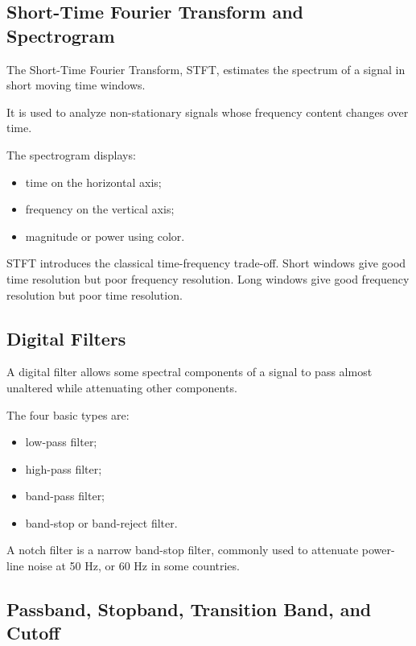 \subsection{Short-Time Fourier Transform and Spectrogram}

The Short-Time Fourier Transform, STFT, estimates the spectrum of a signal in short moving time windows.

It is used to analyze non-stationary signals whose frequency content changes over time.

The spectrogram displays:

\begin{itemize}[noitemsep]
    \item time on the horizontal axis;
    \item frequency on the vertical axis;
    \item magnitude or power using color.
\end{itemize}

\begin{authornote}
STFT introduces the classical time-frequency trade-off. Short windows give good time resolution but poor frequency resolution. Long windows give good frequency resolution but poor time resolution.
\end{authornote}

\subsection{Digital Filters}

A digital filter allows some spectral components of a signal to pass almost unaltered while attenuating other components.

The four basic types are:

\begin{itemize}[noitemsep]
    \item low-pass filter;
    \item high-pass filter;
    \item band-pass filter;
    \item band-stop or band-reject filter.
\end{itemize}

A notch filter is a narrow band-stop filter, commonly used to attenuate power-line noise at 50 Hz, or 60 Hz in some countries.

\subsection{Passband, Stopband, Transition Band, and Cutoff}

